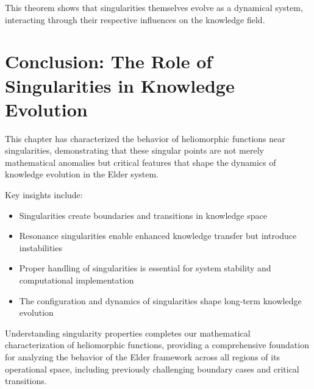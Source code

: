 This theorem shows that singularities themselves evolve as a dynamical system, interacting through their respective influences on the knowledge field.

\section{Conclusion: The Role of Singularities in Knowledge Evolution}

This chapter has characterized the behavior of heliomorphic functions near singularities, demonstrating that these singular points are not merely mathematical anomalies but critical features that shape the dynamics of knowledge evolution in the Elder system.

Key insights include:
\begin{itemize}
    \item Singularities create boundaries and transitions in knowledge space
    \item Resonance singularities enable enhanced knowledge transfer but introduce instabilities
    \item Proper handling of singularities is essential for system stability and computational implementation
    \item The configuration and dynamics of singularities shape long-term knowledge evolution
\end{itemize}

Understanding singularity properties completes our mathematical characterization of heliomorphic functions, providing a comprehensive foundation for analyzing the behavior of the Elder framework across all regions of its operational space, including previously challenging boundary cases and critical transitions.